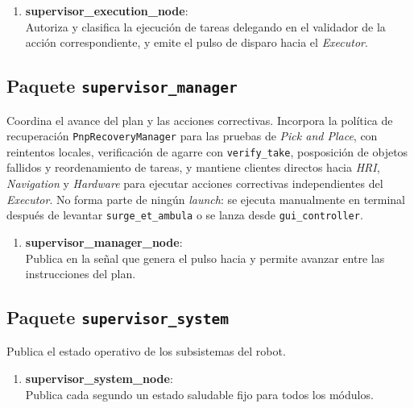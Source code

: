 \begin{enumerate}
    \item \textbf{supervisor\_execution\_node}: \\
    Autoriza y clasifica la ejecución de tareas delegando en el validador de la acción correspondiente, y emite el pulso de disparo hacia el \textit{Executor}.
\end{enumerate}


\subsection{Paquete \texttt{supervisor\_manager}}
Coordina el avance del plan y las acciones correctivas. Incorpora la política de recuperación \texttt{PnpRecoveryManager} para las pruebas de \textit{Pick and Place}, con reintentos locales, verificación de agarre con \texttt{verify\_take}, posposición de objetos fallidos y reordenamiento de tareas, y mantiene clientes directos hacia \textit{HRI}, \textit{Navigation} y \textit{Hardware} para ejecutar acciones correctivas independientes del \textit{Executor}. No forma parte de ningún \textit{launch}: se ejecuta manualmente en terminal después de levantar \texttt{surge\_et\_ambula} o se lanza desde \texttt{gui\_controller}.

\begin{enumerate}
    \item \textbf{supervisor\_manager\_node}: \\
    Publica en  la señal que genera el pulso hacia  y permite avanzar entre las instrucciones del plan.
\end{enumerate}


\subsection{Paquete \texttt{supervisor\_system}}
Publica el estado operativo de los subsistemas del robot.

\begin{enumerate}
    \item \textbf{supervisor\_system\_node}: \\
    Publica cada segundo un estado saludable fijo para todos los módulos.
\end{enumerate}

